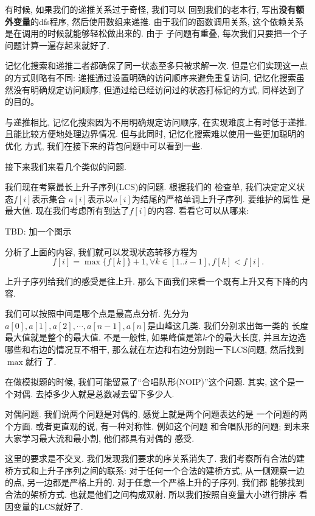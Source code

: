  有时候, 如果我们的递推关系过于奇怪, 我们可以
回到我们的老本行, 写出\textbf{没有额外变量}的dfs程序, 然后使用数组来递推. 
由于我们的函数调用关系, 这个依赖关系是在调用的时候就能够轻松做出来的. 由于
子问题有重叠, 每次我们只要把一个子问题计算一遍存起来就好了. 

记忆化搜索和递推二者都确保了同一状态至多只被求解一次. 但是它们实现这一点
的方式则略有不同: 递推通过设置明确的访问顺序来避免重复访问, 
记忆化搜索虽然没有明确规定访问顺序, 但通过给已经访问过的状态打标记的方式, 
同样达到了的目的。

与递推相比, 记忆化搜索因为不用明确规定访问顺序, 在实现难度上有时低于递推. 
且能比较方便地处理边界情况. 但与此同时, 记忆化搜索难以使用一些更加聪明的优化
方式, 我们在接下来的背包问题中可以看到一些. 


接下来我们来看几个类似的问题. 

 我们现在考察最长上升子序列(LCS)的问题. 根据我们的
检查单, 我们决定定义状态$f[i]$表示集合
$a[i]$表示以$a[i]$为结尾的严格单调上升子序列. 要维护的属性
是最大值. 现在我们考虑所有到达了$f[i]$的内容. 看看它可以从哪来: 

TBD: 加一个图示

分析了上面的内容, 我们就可以发现状态转移方程为 
$$f[i] = \max \{f[k]\} +1, \forall k\in [1..i-1], f[k]<f[i].$$

上升子序列给我们的感受是往上升. 那么下面我们来看一个既有上升又有下降的内容. 

我们可以按照中间是哪个点是最高点分析. 先分为
$a[0],a[1], a[2],\cdots, a[n-1], a[n]$是山峰这几类. 我们分别求出每一类的
长度最大值就是整个的最大值. 不是一般性, 如果峰值是第$k$个的最大长度, 并且左边选
哪些和右边的情况互不相干, 那么就在左边和右边分别跑一下LCS问题, 然后找到$\max$就行
了. 

在做模拟题的时候, 我们可能留意了``合唱队形(NOIP)''这个问题. 其实, 这个是一个对偶.
去掉多少人就是总数减去留下多少人. 

\begin{remark}
    对偶问题. 我们说两个问题是对偶的, 感觉上就是两个问题表达的是
    一个问题的两个方面. 或者更直观的说, 有一种对称性. 例如这个问题
    和合唱队形的问题; 到未来大家学习最大流和最小割, 他们都具有对偶的
    感受. 
\end{remark}

 这里的要求是不交叉. 我们发现我们要求的序关系消失了. 
我们考察所有合法的建桥方式和上升子序列之间的联系: 对于任何一个合法的建桥方式, 
从一侧观察一边的点, 另一边都是严格上升的. 对于任意一个严格上升的子序列, 我们都
能够找到合法的架桥方式. 也就是他们之间构成双射. 所以我们按照自变量大小进行排序
看因变量的LCS就好了. 

